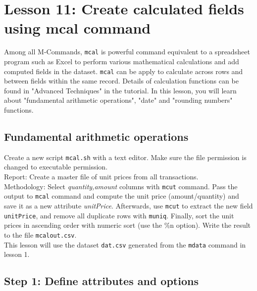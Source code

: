 

%

\section{Lesson 11: Create calculated fields using mcal command}

Among all M-Commands, \verb|mcal| is powerful command equivalent to a spreadsheet program such as Excel to perform various mathematical calculations and add computed fields in the dataset. \verb|mcal| can be apply to calculate across rows and between fields within the same record. Details of calculation functions can be found in "Advanced Techniques" in the tutorial. In this lesson, you will learn about "fundamental arithmetic operations", "date" and "rounding numbers" functions.

\subsection{Fundamental arithmetic operations }

Create a new script \verb|mcal.sh| with a text editor. Make sure the file permission is changed to executable permission. \\

Report:  Create a master file of unit prices from all transactions.  \\ 

Methodology: Select \emph{quantity,amount} columns with \verb|mcut| command. Pass the output to \verb|mcal| command and compute the unit price (amount/quantity) and save it as a new attribute \emph{unitPrice}. Afterwards, use \verb|mcut| to extract the new field \verb|unitPrice|, and remove all duplicate rows with \verb|muniq|. Finally, sort the unit prices in ascending order with numeric sort (use the \%n option).  Write the result to the file \verb|mcalout.csv|.\\

This lesson will use the dataset \verb|dat.csv| generated from the \verb|mdata| command in lesson 1. 

\subsection{Step 1: Define attributes and options }

